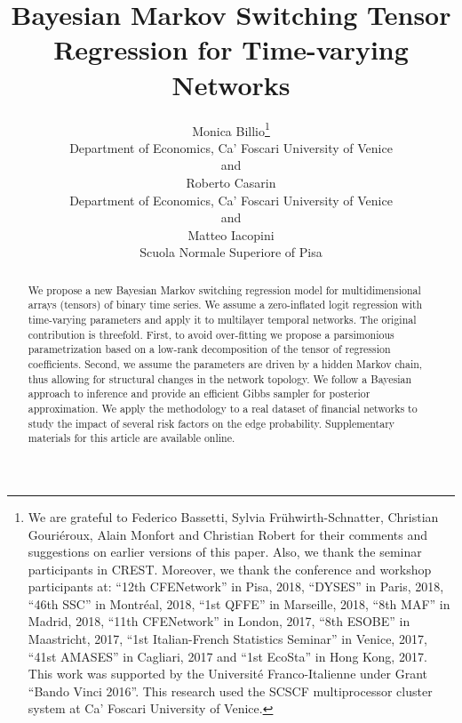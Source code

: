 \documentclass[12pt,a4paper]{article}
\theoremstyle{custom}
\begin{document}
\def\spacingset#1{\renewcommand{\baselinestretch}%
{#1}\small\normalsize} \spacingset{1}


\title{\bf Bayesian Markov Switching Tensor Regression for Time-varying Networks}

\author{Monica Billio\thanks{
We are grateful to Federico Bassetti, Sylvia Fr\"uhwirth-Schnatter, Christian Gouriéroux, Alain Monfort and Christian Robert for their comments and suggestions on earlier versions of this paper. Also, we thank the seminar participants in CREST. Moreover, we thank the conference and workshop participants at: ``12th CFENetwork'' in Pisa, 2018, ``DYSES'' in Paris, 2018, ``46th SSC'' in Montréal, 2018, ``1st QFFE'' in Marseille, 2018, ``8th MAF'' in Madrid, 2018, ``11th CFENetwork'' in London, 2017, ``8th ESOBE'' in Maastricht, 2017, ``1st Italian-French Statistics Seminar'' in Venice, 2017, ``41st AMASES'' in Cagliari, 2017 and ``1st EcoSta'' in Hong Kong, 2017.
This work was supported by the Université Franco-Italienne under Grant ``Bando Vinci 2016''. This research used the SCSCF multiprocessor cluster system at Ca' Foscari University of Venice.}\hspace{.2cm}\\
Department of Economics, Ca' Foscari University of Venice\\
and \\
Roberto Casarin \\
Department of Economics, Ca' Foscari University of Venice\\
and\\
Matteo Iacopini \\
Scuola Normale Superiore of Pisa}

\maketitle


\bigskip
\begin{abstract}
We propose a new Bayesian Markov switching regression model for multidimensional arrays (tensors) of binary time series. We assume a zero-inflated logit regression with time-varying parameters and apply it to multilayer temporal networks. The original contribution is threefold. First, to avoid over-fitting we propose a parsimonious parametrization based on a low-rank decomposition of the tensor of regression coefficients. Second, we assume the parameters are driven by a hidden Markov chain, thus allowing for structural changes in the network topology. We follow a Bayesian approach to inference and provide an efficient Gibbs sampler for posterior approximation. We apply the methodology to a real dataset of financial networks to study the impact of several risk factors on the edge probability.
Supplementary materials for this article are available online.
\end{abstract}
\end{document}
